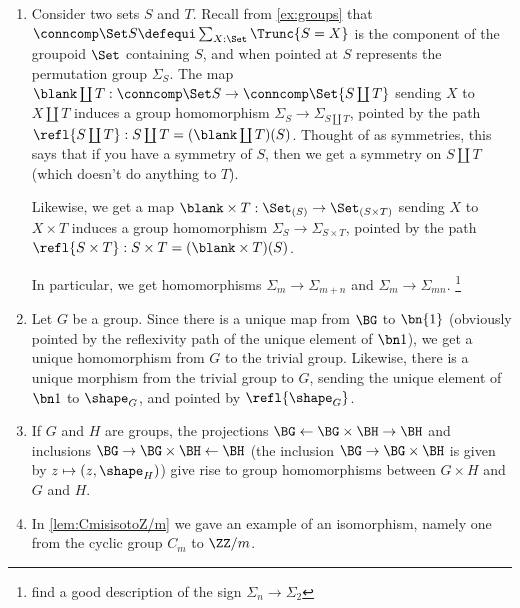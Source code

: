 \begin{example}%
  \label{ex:groups-morphisms}%
  \leavevmode
  \begin{enumerate}
  \item Consider two sets $S$ and $T$.  Recall from \cref{ex:groups}
    that $\conncomp \Set S \defequi\sum_{X:\Set}\Trunc{S=X}$ is the component
    of the groupoid $\Set$ containing $S$, and when pointed at $S$
    represents the permutation group $\Sigma_S$.  The map
    $\blank\coprod T:\conncomp \Set S \to \conncomp \Set {S\coprod T}$ sending $X$ to $X\coprod T$
    induces a group homomorphism $\Sigma_S\to\Sigma_{S\coprod T}$,
    pointed by the path $\refl {S\coprod T}:S\coprod T = (\blank\coprod T)(S)$.
    Thought of as symmetries, this says that if you have a symmetry of
    $S$, then we get a symmetry on $S\coprod T$ (which doesn't do
    anything to $T$).

    Likewise, we get a map
    $\blank\times T:\Set_{(S)}\to\Set_{(S\times T)}$ sending $X$ to
    $X\times T$ induces a group homomorphism
    $\Sigma_S\to\Sigma_{S\times T}$, pointed by the path
    $\refl {S\times T}: {S\times T} = (\blank \times T)(S)$.

In particular, we get homomorphisms $\Sigma_m\to\Sigma_{m+n}$ and $\Sigma_m\to\Sigma_{mn}$. \footnote{find a good description of the sign $\Sigma_n\to\Sigma_2$}
\item Let $G$ be a group.  Since there is a unique map from $\BG$ to
  $\bn{1} $ (obviously pointed by the reflexivity path of the unique
  element of $\bn 1$), we get a unique homomorphism from $G$ to the
  trivial group.  Likewise, there is a unique morphism from the
  trivial group to $G$, sending the unique element of $\bn 1$ to
  $\shape_G$, and pointed by $\refl {\shape_G}$.
\item If $G$ and $H$ are groups, the projections $\BG\gets \BG\times \BH\to \BH$ and inclusions $\BG\to\BG\times\BH\gets\BH$ 
  (\eg the inclusion $\BG\to\BG\times\BH$ is given by $z\mapsto(z,\shape_H)$) give rise to group homomorphisms between $G\times H$ and $G$ and $H$.
\item In \cref{lem:CmisisotoZ/m} we gave an example of an isomorphism, namely one from the cyclic group $C_m$ to $\ZZ/m$.
  \end{enumerate}
\end{example}

